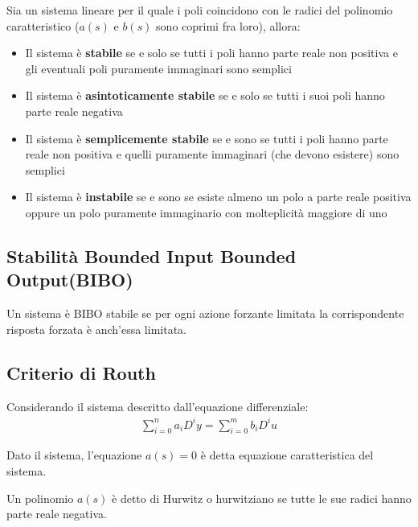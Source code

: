 \begin{theorem}
    Sia un sistema lineare per il quale i poli coincidono con le radici del polinomio caratteristico
    ($a(s)$ e $b(s)$ sono coprimi fra loro), allora: 
    \begin{itemize}
        \item Il sistema è \textbf{stabile} se e solo se tutti i poli hanno parte reale non positiva e gli eventuali poli puramente immaginari sono semplici
        \item Il sistema è \textbf{asintoticamente stabile} se e solo se tutti i suoi poli hanno parte reale negativa
        \item Il sistema è \textbf{semplicemente stabile} se e sono se tutti i poli hanno parte reale non positiva e quelli puramente immaginari (che devono esistere) sono semplici
        \item Il sistema è \textbf{instabile} se e sono se esiste almeno un polo a parte reale positiva oppure un polo puramente immaginario con molteplicità maggiore di uno
    \end{itemize}
\end{theorem}


\subsection{Stabilità Bounded Input Bounded Output(BIBO)}

\begin{definition}[BIBO]
    Un sistema è BIBO stabile se per ogni azione forzante limitata la corrispondente
    risposta forzata è anch'essa limitata.
\end{definition}

\subsection{Criterio di Routh}
Considerando il sistema descritto dall'equazione differenziale:
\begin{align}
    \sum_{i=0}^{n}  a_i D^i y = \sum_{i=0}^{m}  b_i D^i u
\end{align}

\begin{definition}
    Dato il sistema, l'equazione $a(s) = 0$ è detta equazione caratteristica del sistema.
\end{definition}

\begin{definition}
    Un polinomio $a(s)$ è detto di Hurwitz o hurwitziano se tutte le sue radici hanno parte reale negativa.
\end{definition}

